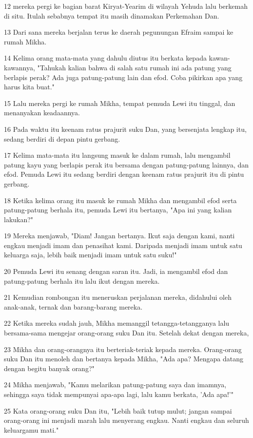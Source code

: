\par 12 mereka pergi ke bagian barat Kiryat-Yearim di wilayah Yehuda lalu berkemah di situ. Itulah sebabnya tempat itu masih dinamakan Perkemahan Dan.
\par 13 Dari sana mereka berjalan terus ke daerah pegunungan Efraim sampai ke rumah Mikha.
\par 14 Kelima orang mata-mata yang dahulu diutus itu berkata kepada kawan-kawannya, "Tahukah kalian bahwa di salah satu rumah ini ada patung yang berlapis perak? Ada juga patung-patung lain dan efod. Coba pikirkan apa yang harus kita buat."
\par 15 Lalu mereka pergi ke rumah Mikha, tempat pemuda Lewi itu tinggal, dan menanyakan keadaannya.
\par 16 Pada waktu itu keenam ratus prajurit suku Dan, yang bersenjata lengkap itu, sedang berdiri di depan pintu gerbang.
\par 17 Kelima mata-mata itu langsung masuk ke dalam rumah, lalu mengambil patung kayu yang berlapis perak itu bersama dengan patung-patung lainnya, dan efod. Pemuda Lewi itu sedang berdiri dengan keenam ratus prajurit itu di pintu gerbang.
\par 18 Ketika kelima orang itu masuk ke rumah Mikha dan mengambil efod serta patung-patung berhala itu, pemuda Lewi itu bertanya, "Apa ini yang kalian lakukan?"
\par 19 Mereka menjawab, "Diam! Jangan bertanya. Ikut saja dengan kami, nanti engkau menjadi imam dan penasihat kami. Daripada menjadi imam untuk satu keluarga saja, lebih baik menjadi imam untuk satu suku!"
\par 20 Pemuda Lewi itu senang dengan saran itu. Jadi, ia mengambil efod dan patung-patung berhala itu lalu ikut dengan mereka.
\par 21 Kemudian rombongan itu meneruskan perjalanan mereka, didahului oleh anak-anak, ternak dan barang-barang mereka.
\par 22 Ketika mereka sudah jauh, Mikha memanggil tetangga-tetangganya lalu bersama-sama mengejar orang-orang suku Dan itu. Setelah dekat dengan mereka,
\par 23 Mikha dan orang-orangnya itu berteriak-teriak kepada mereka. Orang-orang suku Dan itu menoleh dan bertanya kepada Mikha, "Ada apa? Mengapa datang dengan begitu banyak orang?"
\par 24 Mikha menjawab, "Kamu melarikan patung-patung saya dan imamnya, sehingga saya tidak mempunyai apa-apa lagi, lalu kamu berkata, 'Ada apa!'"
\par 25 Kata orang-orang suku Dan itu, "Lebih baik tutup mulut; jangan sampai orang-orang ini menjadi marah lalu menyerang engkau. Nanti engkau dan seluruh keluargamu mati."
